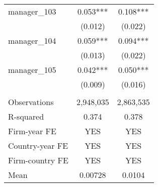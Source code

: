 \begin{tabular}{lcc}
manager\_103 & 0.053*** & 0.108*** \\
 & (0.012) & (0.022) \\
manager\_104 & 0.059*** & 0.094*** \\
 & (0.013) & (0.022) \\
manager\_105 & 0.042*** & 0.050*** \\
 & (0.009) & (0.016) \\
 &  &  \\
Observations & 2,948,035 & 2,863,535 \\
R-squared & 0.374 & 0.378 \\
Firm-year FE & YES & YES \\
Country-year FE & YES & YES \\
Firm-country FE & YES & YES \\
 Mean & 0.00728 & 0.0104 \\ \hline
\end{tabular}
